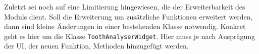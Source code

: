 Zuletzt sei noch auf eine Limitierung hingewiesen, die der Erweiterbarkeit des
Moduls dient. Soll die Erweiterung um zusätzliche Funktionen erweitert werden,
dann sind kleine Änderungen in einer bestehenden Klasse notwendig. Konkret geht es
hier um die Klasse \texttt{ToothAnalyserWidget}. Hier muss je nach Ausprägung der
\ac{UI}, der neuen Funktion, Methoden hinzugefügt werden.
